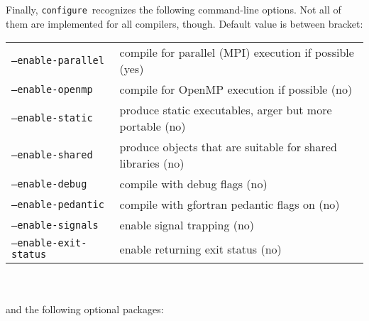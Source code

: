 \documentclass[12pt,a4paper]{article}
\def\configure{\texttt{configure}}
\begin{document}
Finally, \configure\ recognizes the following command-line options.
Not all of them are implemented for all compilers, though. Default value
is between bracket:\\
\begin{tabular}{ll}
\texttt{--enable-parallel}&     compile for parallel (MPI) execution if possible (yes)\\
\texttt{--enable-openmp}&       compile for OpenMP execution if possible (no)\\
\texttt{--enable-static}&       produce static executables, arger but more portable (no)\\
\texttt{--enable-shared}&       produce objects that are suitable for shared libraries (no)\\
\texttt{--enable-debug}&        compile with debug flags (no)\\
\texttt{--enable-pedantic}&     compile with gfortran pedantic flags on (no)\\
\texttt{--enable-signals}&      enable signal trapping (no)\\
\texttt{--enable-exit-status}&  enable returning exit status (no)\\
\end{tabular}\\
\\
and the following optional packages:\\
\end{document}
